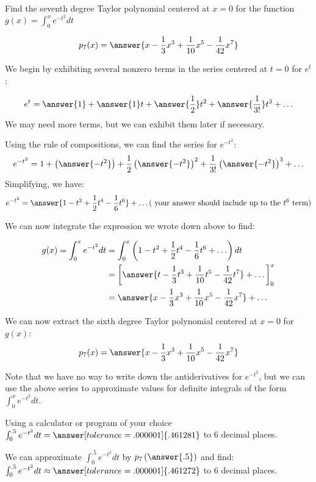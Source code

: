\documentclass{ximera}
\author{Jim Talamo}
\begin{document}
\begin{exercise}
Find the seventh degree Taylor polynomial centered at $x=0$ for the function $g(x) = \int_0^x e^{-t^2} dt$

\[
p_7(x) = \answer{x-\frac{1}{3}x^3+\frac{1}{10}x^5-\frac{1}{42}x^7}
\]

\begin{hint}
We begin by exhibiting several nonzero terms in the series centered at $t=0$ for $e^t$:

\[
e^{t} = \answer{1}+\answer{1}t+\answer{\frac{1}{2}}t^2+\answer{\frac{1}{3!}}t^3+\ldots
\]
We may need more terms, but we can exhibit them later if necessary.

\begin{question}
Using the rule of compositions, we can find the series for $e^{-t^2}$:
\[
e^{-t^2} =1+\left(\answer{-t^2}\right)+\frac{1}{2}\left(\answer{-t^2}\right)^2+\frac{1}{3!}\left(\answer{-t^2}\right)^3+\ldots
\]
Simplifying, we have:
\[
e^{-t^2} = \answer{1-t^2+\frac{1}{2}t^4-\frac{1}{6}t^6}+\ldots (\textrm{ your answer should include up to the } t^6 \textrm{ term})
\]

\begin{question}
We can now integrate the expression we wrote down above to find:

\begin{align*}
g(x) = \int_0^x e^{-t^2} dt &= \int_0^x \left( 1-t^2+\frac{1}{2}t^4-\frac{1}{6}t^6  +\ldots\right) dt \\
&= \bigg[\answer{ t-\frac{1}{3}t^3+\frac{1}{10}t^5-\frac{1}{42}t^7  } + \ldots \bigg]_0^x \\
&= \answer{x-\frac{1}{3}x^3+\frac{1}{10}x^5-\frac{1}{42}x^7} + \ldots 
\end{align*}

We can now extract the sixth degree Taylor polynomial centered at $x=0$ for $g(x)$:
\[
p_7(x) = \answer{x-\frac{1}{3}x^3+\frac{1}{10}x^5-\frac{1}{42}x^7}
\]

\end{question}
\end{question}
\end{hint}

Note that we have no way to write down the antiderivatives for $e^{-t^2}$, but we can use the above series to approximate values for definite integrals of the form $ \int_0^x e^{-t^2} dt$.

Using a calculator or program of your choice $ \int_0^{.5} e^{-t^2} dt = \answer[tolerance=.000001]{.461281} $ to $6$ decimal places.

We can approximate $\int_0^{.5} e^{-t^2} dt$ by $p_7\left(\answer{.5}\right)$ and find: $\int_0^{.5} e^{-t^2} dt \approx \answer[tolerance=.000001]{.461272} $ to $6$ decimal places.

\end{exercise}
\end{document}
